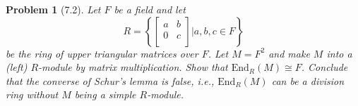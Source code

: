 \documentclass[10pt]{article}
\newcommand{\sk}{\vskip 10mm}
\theoremstyle{plain}
\newtheorem{problem}{Problem}
\theoremstyle{remark}
\begin{document}
\sk

\begin{problem}[7.2]
  Let $F$ be a field and let
  \[
    R =
    \left\{
      \left[
        \begin{array}{cc}
          a&b\\
          0&c\\
        \end{array}
      \right]
      |
      a,b,c\in F
    \right\}
  \]
  be the ring of upper triangular matrices over $F$. Let $M=F^2$ and make
  $M$ into a (left) $R$-module by matrix multiplication. Show that
  $\text{End}_R(M)\cong F$. Conclude that the converse of Schur's lemma
  is false, i.e., $\text{End}_R(M)$ can be a division ring without
  $M$ being a simple $R$-module.
\end{problem}
\end{document}
